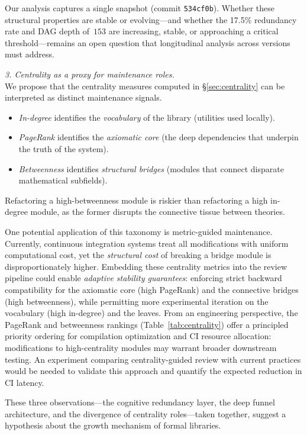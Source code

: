 Our analysis captures a single snapshot (commit \texttt{534cf0b}). Whether these structural properties are stable or evolving---and whether the 17.5\% redundancy rate and DAG depth of~$153$ are increasing, stable, or approaching a critical threshold---remains an open question that longitudinal analysis across  versions must address.

\medskip
\noindent \textit{3. Centrality as a proxy for maintenance roles.} \\
We propose that the centrality measures computed in \S\ref{sec:centrality} can be interpreted as distinct maintenance signals.
\begin{itemize}
    \item \textit{In-degree} identifies the \textit{vocabulary} of the library (utilities used locally).
    \item \textit{PageRank} identifies the \textit{axiomatic core} (the deep dependencies that underpin the truth of the system).
    \item \textit{Betweenness} identifies \textit{structural bridges} (modules that connect disparate mathematical subfields).
\end{itemize}
Refactoring a high-betweenness module is riskier than refactoring a high in-degree module, as the former disrupts the connective tissue between theories.

One potential application of this taxonomy is metric-guided maintenance. Currently, continuous integration systems treat all modifications with uniform computational cost, yet the \textit{structural cost} of breaking a bridge module is disproportionately higher. Embedding these centrality metrics into the review pipeline could enable \textit{adaptive stability guarantees}: enforcing strict backward compatibility for the axiomatic core (high PageRank) and the connective bridges (high betweenness), while permitting more experimental iteration on the vocabulary (high in-degree) and the leaves. From an engineering perspective, the PageRank and betweenness rankings (Table~\ref{tab:centrality}) offer a principled priority ordering for compilation optimization and CI resource allocation: modifications to high-centrality modules may warrant broader downstream testing. An experiment comparing centrality-guided review with current practices would be needed to validate this approach and quantify the expected reduction in CI latency.

\medskip
These three observations---the cognitive redundancy layer, the deep funnel architecture, and the divergence of centrality roles---taken together, suggest a hypothesis about the growth mechanism of formal libraries.

